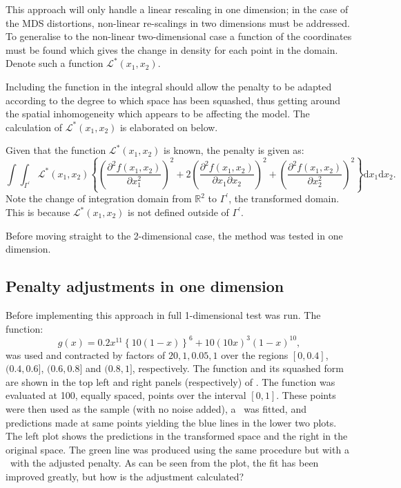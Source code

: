 This approach will only handle a linear rescaling in one dimension; in the case of the MDS distortions, non-linear re-scalings in two dimensions must be addressed. To generalise  to the non-linear two-dimensional case a function of the coordinates must be found which gives the change in density for each point in the domain. Denote such a function $\mathcal{L}^*(x_1,x_2)$. 

Including the function in the integral should allow the penalty to be adapted according to the degree to which space has been squashed, thus getting around the spatial inhomogeneity which appears to be affecting the model. The calculation of $\mathcal{L}^*(x_1,x_2)$ is elaborated on below.

Given that the function $\mathcal{L}^*(x_1,x_2)$ is known, the penalty is given as:
\begin{equation}
\int\int_{\Gamma^\prime} \mathcal{L}^*(x_1,x_2) \left \{ \left (\frac{\partial^2 f(x_1,x_2)}{\partial x_1^2}\right )^2 + 2\left (\frac{\partial^2 f(x_1,x_2)}{\partial x_1 \partial x_2}\right )^2 + \left (\frac{\partial^2 f(x_1,x_2)}{\partial x_2^2}\right )^2\right \} \text{d}x_1 \text{d}x_2.
\label{kdeadjust}
\end{equation}
Note the change of integration domain from $\mathbb{R}^2$ to $\Gamma^\prime$, the transformed domain. This is because $\mathcal{L}^*(x_1,x_2)$ is not defined outside of $\Gamma^\prime$.

Before moving straight to the 2-dimensional case, the method was tested in one dimension.

\subsection{Penalty adjustments in one dimension}

Before implementing this approach in full 1-dimensional test was run. The function:
\begin{equation}
g(x)=0.2x^{11}\left \{ 10(1-x) \right \}^6+10(10x)^3(1-x)^{10},
\label{hardfcn}
\end{equation}
was used and contracted by factors of $20,1,0.05,1$ over the regions $[0,0.4]$, $(0.4,0.6]$, $(0.6,0.8]$ and $(0.8,1]$, respectively. The function and its squashed form are shown in the top left and right panels (respectively) of . The function was evaluated at 100, equally spaced, points over the interval $[0,1]$. These points were then used as the sample (with no noise added), a \tprs\ was fitted, and predictions made at same points yielding the blue lines in the lower two plots. The left plot shows the predictions in the transformed space and the right in the original space. The green line was produced using the same procedure but with a \tprs\ with the adjusted penalty. As can be seen from the plot, the fit has been improved greatly, but how is the adjustment calculated?

